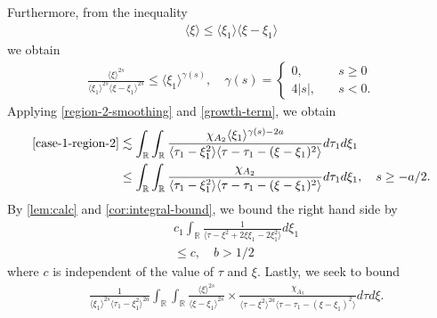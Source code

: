 \documentclass[12pt,reqno]{amsart}
\numberwithin{equation}{section}  %
\numberwithin{figure}{section}
\newcommand{\rr}{\mathbb{R}}
\theoremstyle{plain}
\theoremstyle{definition}
\theoremstyle{remark}
\begin{document}
%
%
Furthermore, from the inequality
%
%
\begin{equation*}
\begin{split}
  \langle \xi \rangle  \le \langle \xi_{1} \rangle \langle \xi - \xi_{1} \rangle 
\end{split}
\end{equation*}
%
we obtain
%
%
\begin{equation}
  \label{growth-term}
\begin{split}
  \frac{\langle \xi \rangle ^{2s}}{\langle \xi_{1} \rangle ^{2s} \langle \xi -
  \xi_{1} \rangle ^{2s}} \le \langle \xi_{1} \rangle ^{\gamma(s)},
  \quad 
  \gamma(s) = 
  \begin{cases} 0, \quad & s \ge 0
    \\
    4|s|, \quad & s < 0.
  \end{cases}
\end{split}
\end{equation}
Applying \eqref{region-2-smoothing} and \eqref{growth-term}, we obtain 
%
%
\begin{equation*}
\begin{split}
  \eqref{case-1-region-2}
  & \lesssim
  \int_{\rr} \int_{\rr}  \frac{\chi_{A_{2}} \langle \xi_{1} \rangle
  ^{\gamma(s) -2a}}{ 
  \langle \tau_{1} - \xi_{1}^{2} \rangle \langle  \tau - \tau_{1} -
    (\xi - \xi_{1})^{2} \rangle }
    d \tau_1 d \xi_{1}
    \\
    & \le \int_{\rr} \int_{\rr}  \frac{\chi_{A_{2}}}{ 
    \langle \tau_{1} - \xi_{1}^{2} \rangle \langle  \tau - \tau_{1} -
    (\xi - \xi_{1})^{2} \rangle }
    d \tau_1 d \xi_{1}, \quad s \ge -a/2.
  \end{split}
\end{equation*}
%
%
By \autoref{lem:calc} and \autoref{cor:integral-bound}, we bound the right hand
side by
%
%
\begin{equation*}
\begin{split}
  & c_{1} \int_{\rr}  \frac{1}{\langle \tau - \xi^{2} + 2 \xi \xi_{1} - 2
  \xi_{1}^{2} \rangle }d \xi_{1}
  \\
  & \le  c, \quad b > 1/2
\end{split}
\end{equation*}
%
%
where $c$ is independent of the value of $\tau$ and $\xi$. 
%
Lastly, we seek to bound
\begin{equation*}
\begin{split}
  &  \frac{1}{\langle \xi_{1} \rangle ^{2s}
  \langle \tau_{1} - \xi_{1}^{2}  \rangle
  ^{2a}} \int_{\rr} \int_{\rr} \frac{\langle \xi \rangle ^{2s}}{\langle
  \xi - \xi_{1}\rangle ^{2s}}  \times \frac{\chi_{A_{3}}}{\langle
  \tau - \xi^{2} \rangle ^{2a} \langle \tau - \tau_{1} - (\xi -
  \xi_{1})^{2} \rangle } d \tau d \xi.
\end{split}
\end{equation*}
\end{document}
